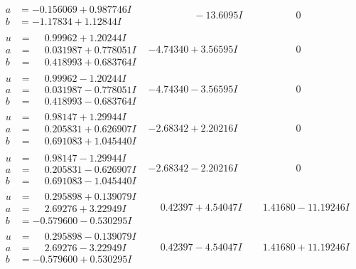 \documentclass[1p]{elsarticle_modified}
\theoremstyle{definition}
\begin{document}
$$\begin{array}{c|c|c}
\begin{aligned}
a &= -0.156069 + 0.987746 I \\
b &= -1.17834 + 1.12844 I\end{aligned}
 & \phantom{-0.000000 } -13.6095 I & \phantom{-0.000000 } 0 \\ \hline\begin{aligned}
u &= \phantom{-}0.99962 + 1.20244 I \\
a &= \phantom{-}0.031987 + 0.778051 I \\
b &= \phantom{-}0.418993 + 0.683764 I\end{aligned}
 & -4.74340 + 3.56595 I & \phantom{-0.000000 } 0 \\ \hline\begin{aligned}
u &= \phantom{-}0.99962 - 1.20244 I \\
a &= \phantom{-}0.031987 - 0.778051 I \\
b &= \phantom{-}0.418993 - 0.683764 I\end{aligned}
 & -4.74340 - 3.56595 I & \phantom{-0.000000 } 0 \\ \hline\begin{aligned}
u &= \phantom{-}0.98147 + 1.29944 I \\
a &= \phantom{-}0.205831 + 0.626907 I \\
b &= \phantom{-}0.691083 + 1.045440 I\end{aligned}
 & -2.68342 + 2.20216 I & \phantom{-0.000000 } 0 \\ \hline\begin{aligned}
u &= \phantom{-}0.98147 - 1.29944 I \\
a &= \phantom{-}0.205831 - 0.626907 I \\
b &= \phantom{-}0.691083 - 1.045440 I\end{aligned}
 & -2.68342 - 2.20216 I & \phantom{-0.000000 } 0 \\ \hline\begin{aligned}
u &= \phantom{-}0.295898 + 0.139079 I \\
a &= \phantom{-}2.69276 + 3.22949 I \\
b &= -0.579600 - 0.530295 I\end{aligned}
 & \phantom{-}0.42397 + 4.54047 I & \phantom{-}1.41680 - 11.19246 I \\ \hline\begin{aligned}
u &= \phantom{-}0.295898 - 0.139079 I \\
a &= \phantom{-}2.69276 - 3.22949 I \\
b &= -0.579600 + 0.530295 I\end{aligned}
 & \phantom{-}0.42397 - 4.54047 I & \phantom{-}1.41680 + 11.19246 I\\

\end{array}$$
\end{document}
